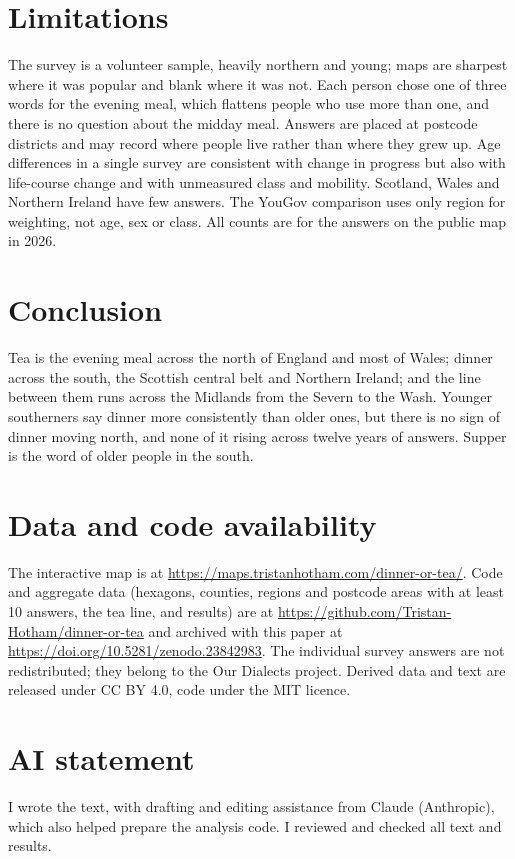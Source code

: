 \documentclass[11pt,a4paper]{article}
\begin{document}
\section{Limitations}
The survey is a volunteer sample, heavily northern and young; maps are sharpest where it was popular and blank where it was not. Each person chose one of three words for the evening meal, which flattens people who use more than one, and there is no question about the midday meal. Answers are placed at postcode districts and may record where people live rather than where they grew up. Age differences in a single survey are consistent with change in progress but also with life-course change and with unmeasured class and mobility. Scotland, Wales and Northern Ireland have few answers. The YouGov comparison uses only region for weighting, not age, sex or class. All counts are for the answers on the public map in 2026.

\section{Conclusion}
Tea is the evening meal across the north of England and most of Wales; dinner across the south, the Scottish central belt and Northern Ireland; and the line between them runs across the Midlands from the Severn to the Wash. Younger southerners say dinner more consistently than older ones, but there is no sign of dinner moving north, and none of it rising across twelve years of answers. Supper is the word of older people in the south.

\section*{Data and code availability}
The interactive map is at \url{https://maps.tristanhotham.com/dinner-or-tea/}. Code and aggregate data (hexagons, counties, regions and postcode areas with at least 10 answers, the tea line, and results) are at \url{https://github.com/Tristan-Hotham/dinner-or-tea} and archived with this paper at \url{https://doi.org/10.5281/zenodo.23842983}. The individual survey answers are not redistributed; they belong to the Our Dialects project. Derived data and text are released under CC BY 4.0, code under the MIT licence.

\section*{AI statement}
I wrote the text, with drafting and editing assistance from Claude (Anthropic), which also helped prepare the analysis code. I reviewed and checked all text and results.
\end{document}

